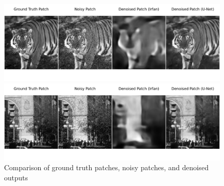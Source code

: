 \documentclass[]{beamer}
\begin{document}
\begin{frame}[plain]{}
    \begin{figure}
        \scriptsize
        \captionsetup{font=scriptsize}
        \centering
        
        \includegraphics[trim={0 1cm 0 0},clip,width=\textwidth]{img/irfan_vs_unet_1.pdf}
        
        \includegraphics[trim={0 1cm 0 2cm},clip,width=\textwidth]{img/irfan_vs_unet_2.pdf}
        
        \caption{Comparison of ground truth patches, noisy patches, and denoised outputs}
    \end{figure}
\end{frame}

\end{document}
